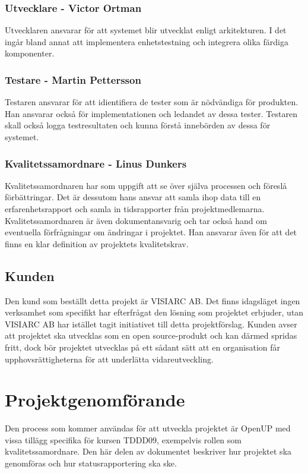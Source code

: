 \subsubsection*{Utvecklare - Victor Ortman}
Utvecklaren ansvarar för att systemet blir utvecklat enligt arkitekturen. I det ingår bland annat att implementera enhetstestning och integrera olika färdiga komponenter.

\subsubsection*{Testare - Martin Pettersson}
Testaren ansvarar för att idientifiera de tester som är nödvändiga för produkten. Han ansvarar också för implementationen och ledandet av dessa tester. Testaren skall också logga testresultaten och kunna förstå innebörden av dessa för systemet.

\subsubsection*{Kvalitetssamordnare - Linus Dunkers}
Kvalitetssamordnaren har som uppgift att se över själva processen och föreslå förbättringar. Det är dessutom hans ansvar att samla ihop data till en erfarenhetsrapport och samla in tidsrapporter från projektmedlemarna. Kvalitetssamordnaren är även dokumentansvarig och tar också hand om eventuella förfrågningar om ändringar i projektet. Han ansvarar även för att det finns en klar definition av projektets kvalitetskrav.

\subsection{Kunden}
Den kund som beställt detta projekt är VISIARC AB. Det finns idagsläget ingen verksamhet som specifikt har efterfrågat den lösning som projektet erbjuder, utan VISIARC AB har istället tagit initiativet till detta projektförslag. Kunden avser att projektet ska utvecklas som en open source-produkt och kan därmed spridas fritt, dock bör projektet utvecklas på ett sådant sätt att en organisation får upphovsrättigheterna för att underlätta vidareutveckling.

\section{Projektgenomförande}
Den process som kommer användas för att utveckla projektet är OpenUP\cite{openup} med vissa tillägg specifika för kursen TDDD09, exempelvis rollen som kvalitetssamordnare\cite{sandahl}. Den här delen av dokumentet beskriver hur projektet ska genomföras och hur statusrapportering ska ske.

